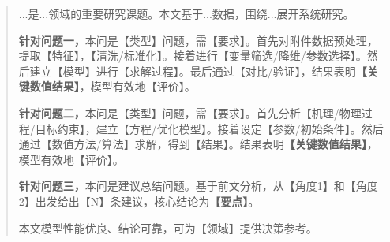 \begin{abstract}

...是...领域的重要研究课题。本文基于...数据，围绕...展开系统研究。

\textbf{针对问题一，}本问是【类型】问题，需【要求】。首先对附件数据预处理，提取【特征】，【清洗/标准化】。接着进行【变量筛选/降维/参数选择】。然后建立【模型】进行【求解过程】。最后通过【对比/验证】，结果表明\textbf{【关键数值结果】}，模型有效地【评价】。

\textbf{针对问题二，}本问是【类型】问题，需【要求】。首先分析【机理/物理过程/目标约束】，建立【方程/优化模型】。接着设定【参数/初始条件】。然后通过【数值方法/算法】求解，得到【结果】。结果表明\textbf{【关键数值结果】}，模型有效地【评价】。

\textbf{针对问题三，}本问是建议总结问题。基于前文分析，从【角度1】和【角度2】出发给出【N】条建议，核心结论为\textbf{【要点】}。

本文模型性能优良、结论可靠，可为【领域】提供决策参考。

\label{abstract:end}
\end{abstract}
